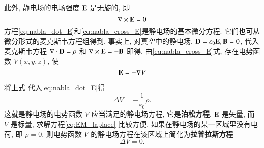 此外, 静电场的电场强度 ${\mathbf{E}}$ 是无旋的, 即
\begin{equation}
    \nabla \times {\mathbf{E}}=0
    \label{eq:nabla_cross_E}
\end{equation}
方程\ref{eq:nabla_dot_E}和\ref{eq:nabla_cross_E}是静电场的基本微分方程. 它们也可从微分形式的麦克斯韦方程组得到. 
事实上, 对真空中的静电场, ${\mathbf{D}}=\varepsilon_0 {\mathbf{E}}, {\mathbf{B}}=0$, 代入麦克斯韦方程 
$\nabla \cdot {\mathbf{D}}=\rho$ 和 $\nabla \times {\mathbf{E}}=-{\mathbf{B}}$ 即得.
由\ref{eq:nabla_cross_E}式, 存在电势函数 $V(x, y, z)$, 使
$$
{\mathbf{E}}=-\nabla V
$$

将上式 代入\ref{eq:nabla_dot_E}得
\begin{equation}
    \Delta V=-\frac{1}{\varepsilon_0} \rho .
    \label{eq:EM_laplace}
\end{equation}
这就是静电场的电势函数 $V$ 应当满足的静电场方程, 它是\textbf{泊松方程}. ${\mathbf{E}}$ 是矢量, 而 $V$ 是标量, 求解方程\ref{eq:EM_laplace} 比较方便.
如果在静电场的某一区域里没有电荷, 即 $\rho=0$, 则电势函数 $V$ 的静电场方程在该区域上简化为\textbf{拉普拉斯方程}
\begin{equation}
    \Delta V=0.
    \label{eq:EM_poisson}
\end{equation}
